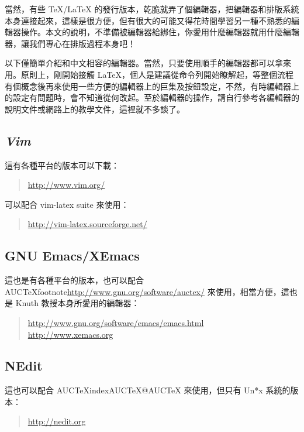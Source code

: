 當然，有些 \TeX{}/\LaTeX{} 的發行版本，乾脆就弄了個編輯器，把編輯器和排版系統本身連接起來，這樣是很方便，但有很大的可能又得花時間學習另一種不熟悉的編輯器操作。本文的說明，不準備被編輯器給綁住，你愛用什麼編輯器就用什麼編輯器，讓我們專心在排版過程本身吧！

以下僅簡單介紹和中文相容的編輯器。當然，只要使用順手的編輯器都可以拿來用。原則上，剛開始接觸 \LaTeX{}，個人是建議從命令列開始瞭解起，等整個流程有個概念後再來使用一些方便的編輯器上的巨集及按鈕設定，不然，有時編輯器上的設定有問題時，會不知道從何改起。至於編輯器的操作，請自行參考各編輯器的說明文件或網路上的教學文件，這裡就不多談了。

\subsection{{\sl V}{\it im}}
這有各種平台的版本可以下載：

\begin{quote}
   \url{http://www.vim.org/}
\end{quote}

可以配合 vim-latex suite 來使用：

\begin{quote}
   \url{http://vim-latex.sourceforge.net/}
\end{quote}

\subsection{GNU Emacs/XEmacs}

這也是有各種平台的版本，也可以配合
AUC\TeX{}footnote{\url{http://www.gnu.org/software/auctex/}}
來使用，相當方便，這也是 Knuth 教授本身所愛用的編輯器：

\begin{quote}
   \url{http://www.gnu.org/software/emacs/emacs.html}    \\
   \url{http://www.xemacs.org}
\end{quote}

\subsection{NEdit}

這也可以配合 AUC\TeX{}index{AUCTeX@AUC\TeX} 來使用，但只有 Un*x 系統的版本：

\begin{quote}
   \url{http://nedit.org}
\end{quote}

